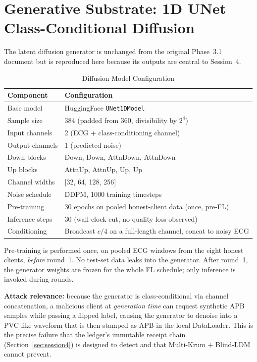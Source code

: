 \documentclass[11pt,a4paper]{article}
\begin{document}
\section{Generative Substrate: 1D UNet Class-Conditional Diffusion}
\label{sec:diffusion}

The latent diffusion generator is unchanged from the original Phase~3.1
document but is reproduced here because its outputs are central to
Session~4.

\begin{table}[H]
\centering
\caption{Diffusion Model Configuration}
\label{tab:diff}
\begin{tabular}{@{}ll@{}}
\toprule
\textbf{Component} & \textbf{Configuration} \\
\midrule
Base model         & HuggingFace \texttt{UNet1DModel} \\
Sample size        & 384 (padded from 360, divisibility by $2^4$) \\
Input channels     & 2 (ECG + class-conditioning channel) \\
Output channels    & 1 (predicted noise) \\
Down blocks        & Down, Down, AttnDown, AttnDown \\
Up blocks          & AttnUp, AttnUp, Up, Up \\
Channel widths     & [32, 64, 128, 256] \\
Noise schedule     & DDPM, 1000 training timesteps \\
Pre-training       & 30 epochs on pooled honest-client data (once, pre-FL) \\
Inference steps    & 30 (wall-clock cut, no quality loss observed) \\
Conditioning       & Broadcast $c/4$ on a full-length channel, concat to noisy ECG \\
\bottomrule
\end{tabular}
\end{table}

Pre-training is performed once, on pooled ECG windows from the eight
honest clients, \textit{before} round~1. No test-set data leaks into the
generator. After round~1, the generator weights are frozen for the whole
FL schedule; only inference is invoked during rounds.

\textbf{Attack relevance:} because the generator is class-conditional via
channel concatenation, a malicious client at \textit{generation time} can
request synthetic APB samples while passing a flipped label, causing the
generator to denoise into a PVC-like waveform that is then stamped as APB
in the local DataLoader. This is the precise failure that the ledger's
immutable receipt chain (Section~\ref{sec:session4}) is designed to detect
and that Multi-Krum + Blind-LDM cannot prevent.
\end{document}
